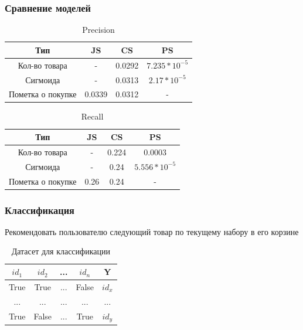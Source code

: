 \documentclass[10pt, unicode]{beamer}
\begin{document}
\begin{frame}
  \frametitle{Сравнение моделей}

  \begin{table}[H]
    \centering
    \begin{tabular} { | c | c | c | c | }
      \hline
      Тип & JS & CS & PS \\
      \hline
      Кол-во товара & - & 0.0292 & $7.235 * 10^{-5}$ \\
      \hline
      Сигмоида & - & 0.0313 & $2.17 * 10^{-5}$ \\
      \hline
      Пометка о покупке & 0.0339 & 0.0312 & - \\
      \hline
    \end{tabular}
    \caption{Precision}
  \end{table}

  \begin{table}[H]
    \centering
    \begin{tabular} { | c | c | c | c | }
      \hline
      Тип & JS & CS & PS \\
      \hline
      Кол-во товара & - & 0.224 & 0.0003\\
      \hline
      Сигмоида & - & 0.24 & $5.556 * 10^{-5}$ \\
      \hline
      Пометка о покупке & 0.26 & 0.24 & - \\
      \hline
    \end{tabular}
    \caption{Recall}
  \end{table}

\end{frame}

\begin{frame}
  \frametitle{Классификация}
  Рекомендовать пользователю следующий товар по текущему набору в его корзине
  \begin{table}[H]
    \centering
    \begin{tabular} { | c | c | c | c | c | }
    \hline
    $id_1$ & $id_2$ & ... & $id_n$ & Y \\
    \hline
    True  & True  & ... & False & $id_x$ \\
    \hline
    ...  & ...  & ... & ... & ... \\
    \hline
    True  & False  & ... & True & $id_y$ \\
    \hline
    \end{tabular}
    \caption{Датасет для классификации}
  \end{table}
\end{frame}
\end{document}
